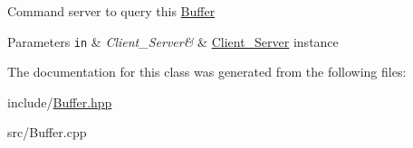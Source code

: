 Command server to query this \hyperlink{classColliderPlusPlus_1_1Buffer}{Buffer} 
\begin{DoxyParams}[1]{Parameters}
\mbox{\tt in}  & {\em Client\-\_\-\-Server\&} & \hyperlink{classColliderPlusPlus_1_1Client__Server}{Client\-\_\-\-Server} instance \\
\hline
\end{DoxyParams}


The documentation for this class was generated from the following files\-:\begin{DoxyCompactItemize}
\item 
include/\hyperlink{Buffer_8hpp}{Buffer.\-hpp}\item 
src/Buffer.\-cpp\end{DoxyCompactItemize}

